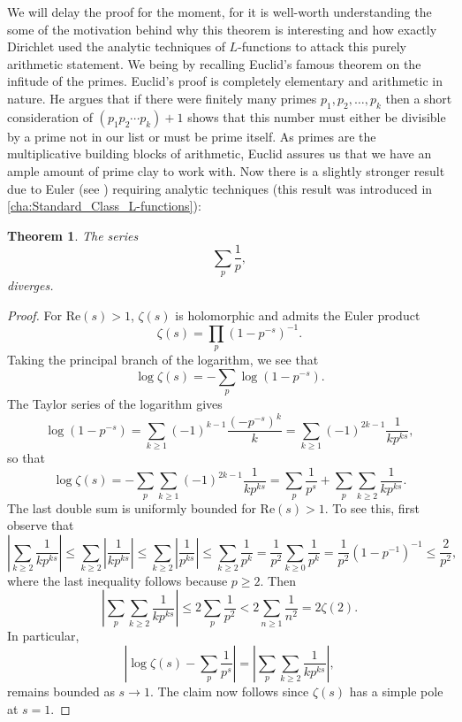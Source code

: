 \documentclass[12pt]{book}
\newtheorem{theorem}{Theorem}[section]
\theoremstyle{definition}\newframedtheorem{method}{Method}
\newcommand{\z}{\zeta}
\newcommand{\<}{\langle}
\renewcommand{\>}{\rangle}
\renewcommand{\Re}{\mathrm{Re}}
\begin{document}
      We will delay the proof for the moment, for it is well-worth understanding the some of the motivation behind why this theorem is interesting and how exactly Dirichlet used the analytic techniques of $L$-functions to attack this purely arithmetic statement. We being by recalling Euclid's famous theorem on the infitude of the primes. Euclid's proof is completely elementary and arithmetic in nature. He argues that if there were finitely many primes $p_{1},p_{2},\ldots,p_{k}$ then a short consideration of $(p_{1}p_{2} \cdots p_{k})+1$ shows that this number must either be divisible by a prime not in our list or must be prime itself. As primes are the multiplicative building blocks of arithmetic, Euclid assures us that we have an ample amount of prime clay to work with. Now there is a slightly stronger result due to Euler (see \cite{euler1737variae}) requiring analytic techniques (this result was introduced in \cref{cha:Standard_Class_L-functions}):

      \begin{theorem}\label{thm:reciprocial_sum_of_primes_diverges}
        The series
        \[
          \sum_{p}\frac{1}{p},
        \]
        diverges.
      \end{theorem}
      \begin{proof}
        For $\Re(s) > 1$, $\z(s)$ is holomorphic and admits the Euler product
        \[
          \z(s) = \prod_{p}(1-p^{-s})^{-1}.
        \]
        Taking the principal branch of the logarithm, we see that
        \[
          \log\z(s) = -\sum_{p}\log(1-p^{-s}).
        \]
        The Taylor series of the logarithm gives
        \[
          \log(1-p^{-s}) = \sum_{k \ge 1}(-1)^{k-1}\frac{(-p^{-s})^{k}}{k} = \sum_{k \ge 1}(-1)^{2k-1}\frac{1}{kp^{ks}},
        \]
        so that
        \[
          \log\z(s) = -\sum_{p}\sum_{k \ge 1}(-1)^{2k-1}\frac{1}{kp^{ks}} = \sum_{p}\frac{1}{p^{s}}+\sum_{p}\sum_{k \ge 2}\frac{1}{kp^{ks}}.
        \]
        The last double sum is uniformly bounded for $\Re(s) > 1$. To see this, first observe that
        \[
          \left|\sum_{k \ge 2}\frac{1}{kp^{ks}}\right| \le \sum_{k \ge 2}\left|\frac{1}{kp^{ks}}\right| \le \sum_{k \ge 2}\left|\frac{1}{p^{ks}}\right| \le \sum_{k \ge 2}\frac{1}{p^{k}} = \frac{1}{p^{2}}\sum_{k \ge 0}\frac{1}{p^{k}} = \frac{1}{p^{2}}(1-p^{-1})^{-1} \le \frac{2}{p^{2}},
        \]
        where the last inequality follows because $p \ge 2$. Then
        \[
          \left|\sum_{p}\sum_{k \ge 2}\frac{1}{kp^{ks}}\right| \le 2\sum_{p}\frac{1}{p^{2}} < 2\sum_{n \ge 1}\frac{1}{n^{2}} = 2\z(2).
        \]
        In particular,
        \[
          \left|\log\z(s)-\sum_{p}\frac{1}{p^{s}}\right| = \left|\sum_{p}\sum_{k \ge 2}\frac{1}{kp^{ks}}\right|,
        \]
        remains bounded as $s \to 1$. The claim now follows since $\z(s)$ has a simple pole at $s = 1$.
      \end{proof}
\end{document}
